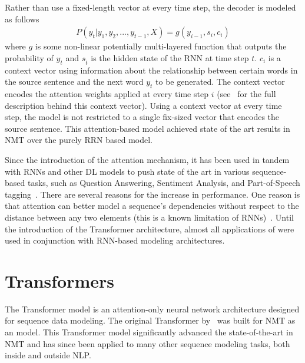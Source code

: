 Rather than use a fixed-length vector at every time step, the decoder is modeled as follows 
\begin{align*}
P(y_t \vert y_1, y_2, ..., y_{t-1}, X) = g(y_{i-1}, s_i, c_i)    
\end{align*}
where $g$ is some non-linear potentially multi-layered function that outputs the probability of $y_{t}$ and $s_{\hat{t}}$ is the hidden state of the RNN at time step $t$. $c_i$ is a context vector using information about the relationship between certain words in the source sentence and the next word $y_t$ to be generated. The context vector encodes the attention weights applied at every time step $i$ (see~\citet{bahdanau2014neural} for the full description behind this context vector). Using a context vector at every time step, the model is not restricted to a single fix-sized vector that encodes the source sentence. This attention-based model achieved state of the art results in NMT over the purely RRN based \ed{} model.

Since the introduction of the attention mechanism, it has been used in tandem with RNNs and other DL models to push state of the art in various sequence-based tasks, such as Question Answering, Sentiment Analysis, and Part-of-Speech tagging~\cite{chaudhari2019attentive}. There are several reasons for the increase in performance. One reason is that attention can better model a sequence's dependencies without respect to the distance between any two elements (this is a known limitation of RNNs)~\cite{vaswani2017attention}. Until the introduction of the Transformer architecture, almost all applications of  were used in conjunction with RNN-based modeling architectures. 


\section{Transformers}
The Transformer model is an attention-only neural network architecture designed for sequence data modeling. The original Transformer by~\citet{vaswani2017attention} was built for NMT as an \ed{} model. This Transformer model significantly advanced the state-of-the-art in NMT and has since been applied to many other sequence modeling tasks, both inside and outside NLP. 
\newcommand{\mb}[1]{\mathbf{#1}}

